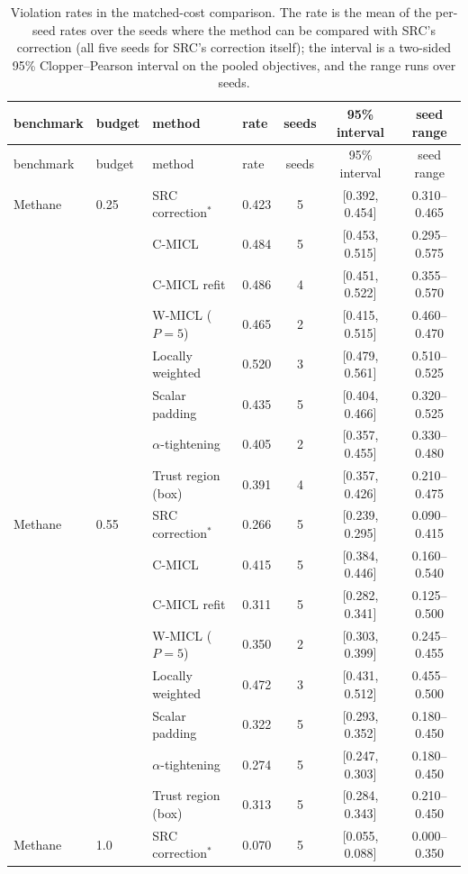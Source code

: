 {\scriptsize
\begin{longtable}{llllccc}
\caption{Violation rates in the matched-cost comparison. The rate is the mean of the
per-seed rates over the seeds where the method can be compared with SRC's correction
(all five seeds for SRC's correction itself); the interval is a two-sided 95\%
Clopper--Pearson interval on the pooled objectives, and the range runs over seeds.}
\label{tab:pooled-rates}\\
\toprule
benchmark & budget & method & rate & seeds & 95\% interval & seed range \\
\midrule
\endfirsthead
\toprule
benchmark & budget & method & rate & seeds & 95\% interval & seed range \\
\midrule
\endhead
Methane & 0.25 & SRC correction$^{\ast}$ & 0.423 & 5 & [0.392, 0.454] & 0.310--0.465 \\
 &  & C-MICL & 0.484 & 5 & [0.453, 0.515] & 0.295--0.575 \\
 &  & C-MICL refit & 0.486 & 4 & [0.451, 0.522] & 0.355--0.570 \\
 &  & W-MICL ($P{=}5$) & 0.465 & 2 & [0.415, 0.515] & 0.460--0.470 \\
 &  & Locally weighted & 0.520 & 3 & [0.479, 0.561] & 0.510--0.525 \\
 &  & Scalar padding & 0.435 & 5 & [0.404, 0.466] & 0.320--0.525 \\
 &  & $\alpha$-tightening & 0.405 & 2 & [0.357, 0.455] & 0.330--0.480 \\
 &  & Trust region (box) & 0.391 & 4 & [0.357, 0.426] & 0.210--0.475 \\
\addlinespace[2pt]
Methane & 0.55 & SRC correction$^{\ast}$ & 0.266 & 5 & [0.239, 0.295] & 0.090--0.415 \\
 &  & C-MICL & 0.415 & 5 & [0.384, 0.446] & 0.160--0.540 \\
 &  & C-MICL refit & 0.311 & 5 & [0.282, 0.341] & 0.125--0.500 \\
 &  & W-MICL ($P{=}5$) & 0.350 & 2 & [0.303, 0.399] & 0.245--0.455 \\
 &  & Locally weighted & 0.472 & 3 & [0.431, 0.512] & 0.455--0.500 \\
 &  & Scalar padding & 0.322 & 5 & [0.293, 0.352] & 0.180--0.450 \\
 &  & $\alpha$-tightening & 0.274 & 5 & [0.247, 0.303] & 0.180--0.450 \\
 &  & Trust region (box) & 0.313 & 5 & [0.284, 0.343] & 0.210--0.450 \\
\addlinespace[2pt]
Methane & 1.0 & SRC correction$^{\ast}$ & 0.070 & 5 & [0.055, 0.088] & 0.000--0.350 \\

\end{longtable}}

